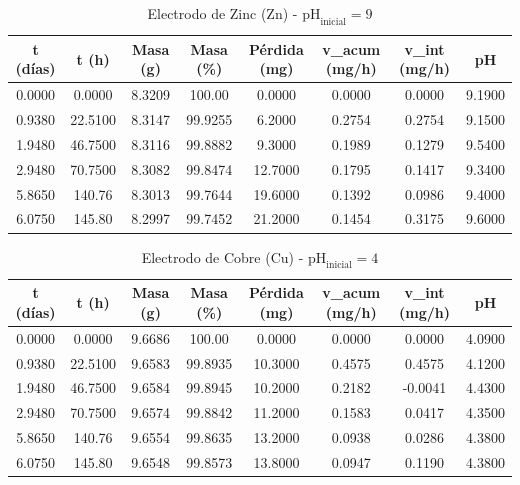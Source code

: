 \documentclass[11pt,a4paper]{article}
\begin{document}
\begin{table}[H]
\centering
\caption{Electrodo de Zinc (Zn) - $\text{pH}_{\text{inicial}} = 9$}
\label{tab:zn_ph9}
\begin{tabular}{cccccccc}
\toprule
t (días) & t (h) & Masa (g) & Masa (\%) & Pérdida (mg) & v\_acum (mg/h) & v\_int (mg/h) & pH \\
\midrule
0.0000 & 0.0000 & 8.3209 & 100.00 & 0.0000 & 0.0000 & 0.0000 & 9.1900 \\
0.9380 & 22.5100 & 8.3147 & 99.9255 & 6.2000 & 0.2754 & 0.2754 & 9.1500 \\
1.9480 & 46.7500 & 8.3116 & 99.8882 & 9.3000 & 0.1989 & 0.1279 & 9.5400 \\
2.9480 & 70.7500 & 8.3082 & 99.8474 & 12.7000 & 0.1795 & 0.1417 & 9.3400 \\
5.8650 & 140.76 & 8.3013 & 99.7644 & 19.6000 & 0.1392 & 0.0986 & 9.4000 \\
6.0750 & 145.80 & 8.2997 & 99.7452 & 21.2000 & 0.1454 & 0.3175 & 9.6000 \\
\bottomrule
\end{tabular}
\end{table}

\begin{table}[H]
\centering
\caption{Electrodo de Cobre (Cu) - $\text{pH}_{\text{inicial}} = 4$}
\label{tab:cu_ph4}
\begin{tabular}{cccccccc}
\toprule
t (días) & t (h) & Masa (g) & Masa (\%) & Pérdida (mg) & v\_acum (mg/h) & v\_int (mg/h) & pH \\
\midrule
0.0000 & 0.0000 & 9.6686 & 100.00 & 0.0000 & 0.0000 & 0.0000 & 4.0900 \\
0.9380 & 22.5100 & 9.6583 & 99.8935 & 10.3000 & 0.4575 & 0.4575 & 4.1200 \\
1.9480 & 46.7500 & 9.6584 & 99.8945 & 10.2000 & 0.2182 & -0.0041 & 4.4300 \\
2.9480 & 70.7500 & 9.6574 & 99.8842 & 11.2000 & 0.1583 & 0.0417 & 4.3500 \\
5.8650 & 140.76 & 9.6554 & 99.8635 & 13.2000 & 0.0938 & 0.0286 & 4.3800 \\
6.0750 & 145.80 & 9.6548 & 99.8573 & 13.8000 & 0.0947 & 0.1190 & 4.3800 \\
\bottomrule
\end{tabular}
\end{table}
\end{document}
